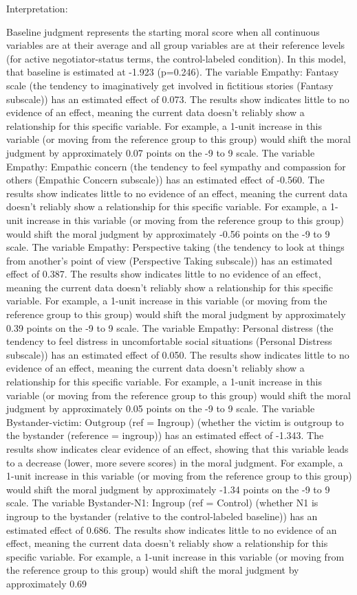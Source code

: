 \documentclass[11pt]{article}
\begin{document}
Interpretation:

Baseline judgment represents the starting moral score when all continuous variables are at their average and all group variables are at their reference levels (for active negotiator-status terms, the control-labeled condition). In this model, that baseline is estimated at -1.923 (p=0.246). The variable Empathy: Fantasy scale (the tendency to imaginatively get involved in fictitious stories (Fantasy subscale)) has an estimated effect of 0.073. The results show indicates little to no evidence of an effect, meaning the current data doesn't reliably show a relationship for this specific variable. For example, a 1-unit increase in this variable (or moving from the reference group to this group) would shift the moral judgment by approximately 0.07 points on the -9 to 9 scale. The variable Empathy: Empathic concern (the tendency to feel sympathy and compassion for others (Empathic Concern subscale)) has an estimated effect of -0.560. The results show indicates little to no evidence of an effect, meaning the current data doesn't reliably show a relationship for this specific variable. For example, a 1-unit increase in this variable (or moving from the reference group to this group) would shift the moral judgment by approximately -0.56 points on the -9 to 9 scale. The variable Empathy: Perspective taking (the tendency to look at things from another's point of view (Perspective Taking subscale)) has an estimated effect of 0.387. The results show indicates little to no evidence of an effect, meaning the current data doesn't reliably show a relationship for this specific variable. For example, a 1-unit increase in this variable (or moving from the reference group to this group) would shift the moral judgment by approximately 0.39 points on the -9 to 9 scale. The variable Empathy: Personal distress (the tendency to feel distress in uncomfortable social situations (Personal Distress subscale)) has an estimated effect of 0.050. The results show indicates little to no evidence of an effect, meaning the current data doesn't reliably show a relationship for this specific variable. For example, a 1-unit increase in this variable (or moving from the reference group to this group) would shift the moral judgment by approximately 0.05 points on the -9 to 9 scale. The variable Bystander-victim: Outgroup (ref = Ingroup) (whether the victim is outgroup to the bystander (reference = ingroup)) has an estimated effect of -1.343. The results show indicates clear evidence of an effect, showing that this variable leads to a decrease (lower, more severe scores) in the moral judgment. For example, a 1-unit increase in this variable (or moving from the reference group to this group) would shift the moral judgment by approximately -1.34 points on the -9 to 9 scale. The variable Bystander-N1: Ingroup (ref = Control) (whether N1 is ingroup to the bystander (relative to the control-labeled baseline)) has an estimated effect of 0.686. The results show indicates little to no evidence of an effect, meaning the current data doesn't reliably show a relationship for this specific variable. For example, a 1-unit increase in this variable (or moving from the reference group to this group) would shift the moral judgment by approximately 0.69 
\end{document}
